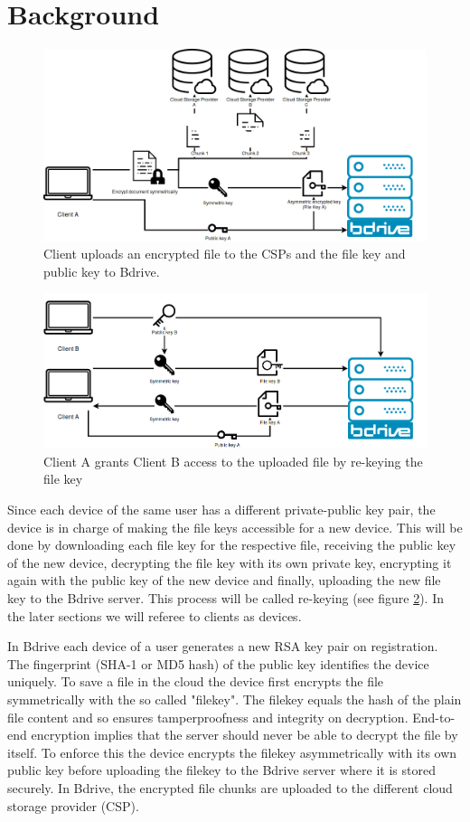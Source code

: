 \section{Background}
\begin{figure}[!ht]
\centering
    \includegraphics[width=0.8\linewidth]{img/bdrive1.png}\par 
    \caption{Client uploads an encrypted file to the \ac{CSP}s and the file key and public key to Bdrive.}
    \label{fig:filekey}
\end{figure}
\begin{figure}[!ht]
\centering
    \includegraphics[width=0.8\linewidth]{img/bdrive2.png}\par
    \caption{Client A grants Client B access to the uploaded file by re-keying the file key}
    \label{fig:rekey}
\end{figure}
Since each device of the same user has a different private-public key pair, the device is in charge of making the file keys accessible for a new device. This will be done by downloading each file key for the respective file, receiving the public key of the new device, decrypting the file key with its own private key, encrypting it again with the public key of the new device and finally, uploading the new file key to the Bdrive server. This process will be called re-keying (see figure \ref{fig:rekey}). In the later sections we will referee to clients as devices. 

In Bdrive each device of a user generates a new \ac{RSA} key pair on registration. The fingerprint (SHA-1 or MD5 hash) of the public key identifies the device uniquely. To save a file in the cloud the device first encrypts the file symmetrically with the so called "filekey". The filekey equals the hash of the plain file content and so ensures tamperproofness and integrity on decryption. End-to-end encryption implies that the server should never be able to decrypt the file by itself. To enforce this the device encrypts the filekey asymmetrically with its own public key before uploading the filekey to the Bdrive server where it is stored securely. In Bdrive, the encrypted file chunks are uploaded to the different cloud storage provider (\ac{CSP}). 

